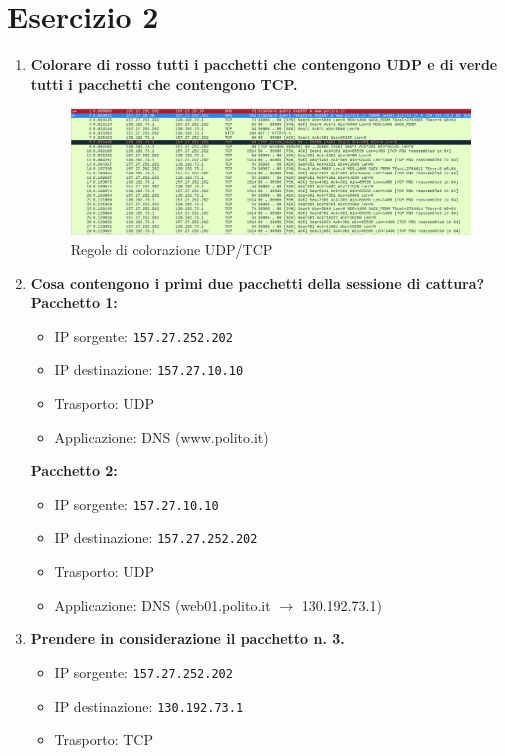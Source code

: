 \documentclass[a4paper,12pt]{article}
\begin{document}
\section*{Esercizio 2}
\begin{enumerate}
  \item \textbf{Colorare di rosso tutti i pacchetti che contengono UDP e di verde tutti i pacchetti che contengono TCP.}\\
    \begin{figure}[h]
      \centering
      \includegraphics[width=0.8\linewidth]{src/filtro_rosso.png}
      \caption{Regole di colorazione UDP/TCP}
    \end{figure}
  \item \textbf{Cosa contengono i primi due pacchetti della sessione di cattura?}\\
    \textbf{Pacchetto 1:}
    \begin{itemize}
      \item IP sorgente: \texttt{157.27.252.202}
      \item IP destinazione: \texttt{157.27.10.10}
      \item Trasporto: UDP
      \item Applicazione: DNS (www.polito.it)
    \end{itemize}
    \textbf{Pacchetto 2:}
    \begin{itemize}
      \item IP sorgente: \texttt{157.27.10.10}
      \item IP destinazione: \texttt{157.27.252.202}
      \item Trasporto: UDP
      \item Applicazione: DNS (web01.polito.it $\to$ 130.192.73.1)
    \end{itemize}
  \item \textbf{Prendere in considerazione il pacchetto n. 3.}\\
    \begin{itemize}
      \item IP sorgente: \texttt{157.27.252.202}
      \item IP destinazione: \texttt{130.192.73.1}
      \item Trasporto: TCP

\end{itemize}
\end{enumerate}
\end{document}
